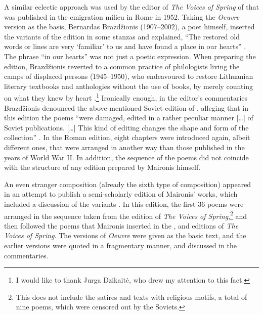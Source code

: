 \begin{paper}
A similar eclectic approach was used by the editor of \emph{The Voices
of Spring} of \citeyear{maironis_pavasario_1913}that was published in the emigration milieu in Rome in 1952. Taking
the \mbox{\emph{Oeuvre}} version as the basis, Bernardas Brazdžionis
(1907--2002), a poet himself, inserted the variants of the \citeyear{maironis_pavasario_1920}
edition in some stanzas and explained, ``The restored old words or lines
are very `familiar' to us and have found a place in our hearts'' \citep[279--80]{brazdzionis_redaktoriaus_1952}. The phrase ``in our hearts'' was not just a
poetic expression. When preparing the edition, Brazdžionis reverted to a common practice of philologists living the camps of displaced persons (1945--1950), who endeavoured to restore Lithuanian literary textbooks and anthologies without the use of books, by merely counting on  what they knew by heart \citep[5]{naujokaitis_lietuviu_1948}.\footnote{I
  would like to thank Jurga Dzikaitė, who drew my attention to this
  fact.} Ironically enough, in the editor's commentaries Brazdžionis
denounced the above-mentioned Soviet edition of \citep{maironis_pavasario_1947}, alleging that in
this edition the poems ``were damaged, edited in a rather peculiar
manner {[}\ldots{}{]} of Soviet publications. {[}\ldots{}{]} This kind of
editing changes the shape and form of the collection'' \citep[294]{brazdzionis_redaktoriaus_1952}. In the Roman edition, eight chapters were introduced again,
albeit different ones, that were arranged in another way than those published in the years of World War II. In addition,  the sequence of the poems did not
coincide with the structure of any edition prepared by Maironis himself.

An even stranger composition (already the sixth type of composition) appeared in an
attempt to publish a semi-scholarly edition of Maironis' works, which
included a discussion of the variants \citep{maironis_pavasario_1982}. In this edition, the first 36
poems were arranged in the sequence taken from the \citeyear{maironis_pavasario_1895} edition of
\emph{The Voices of Spring},\footnote{This does not include the satires and texts with
religious motifs, a total of nine poems, which were censored out by the
Soviets.} and then followed the poems that Maironis inserted in the \citeyear{maironis_pavasario_1905}, \citeyear{maironis_pavasario_1913} and \citeyear{maironis_pavasario_1920} editions of \emph{The Voices of
Spring}. The \citeyear{maironis_maironio_1927} versions of \emph{Oeuvre} were given as the basic
text, and the earlier versions were quoted in a fragmentary manner, and discussed
in the commentaries.


\end{paper}
